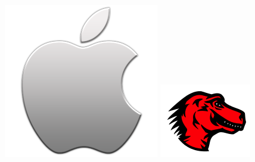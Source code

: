 \documentclass[xcolor=dvipsnames]{beamer}
\begin{document}
\begin{frame}
\begin{figure}
\begin{center}
	\hspace{0.2cm}\includegraphics[scale=0.15]{apple_logo.png}
	\hspace{0.2cm}\includegraphics[scale=0.22]{mozilla.png}\\
	\end{center}
	\end{figure}

\end{frame}
\end{document}
